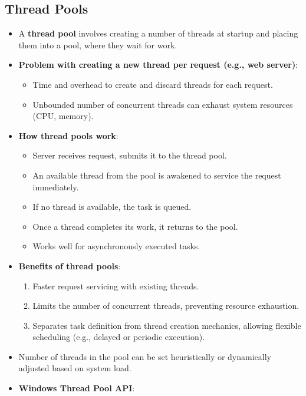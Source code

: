 \subsection{Thread Pools}
\begin{itemize}
    \item A \textbf{thread pool} involves creating a number of threads at startup and placing them into a pool, where they wait for work.
    \item \textbf{Problem with creating a new thread per request (e.g., web server)}:
        \begin{itemize}
            \item Time and overhead to create and discard threads for each request.
            \item Unbounded number of concurrent threads can exhaust system resources (CPU, memory).
        \end{itemize}
    \item \textbf{How thread pools work}:
        \begin{itemize}
            \item Server receives request, submits it to the thread pool.
            \item An available thread from the pool is awakened to service the request immediately.
            \item If no thread is available, the task is queued.
            \item Once a thread completes its work, it returns to the pool.
            \item Works well for asynchronously executed tasks.
        \end{itemize}
    \item \textbf{Benefits of thread pools}:
        \begin{enumerate}
            \item Faster request servicing with existing threads.
            \item Limits the number of concurrent threads, preventing resource exhaustion.
            \item Separates task definition from thread creation mechanics, allowing flexible scheduling (e.g., delayed or periodic execution).
        \end{enumerate}
    \item Number of threads in the pool can be set heuristically or dynamically adjusted based on system load.
    \item \textbf{Windows Thread Pool API}:
        \begin{itemize}

\end{itemize}
\end{itemize}

